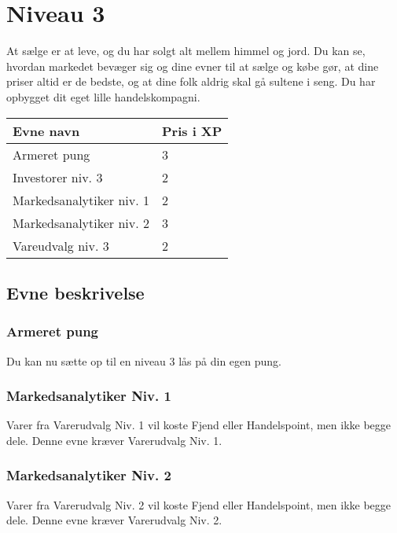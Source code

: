 \chapter{Niveau 3}

At sælge er at leve, og du har solgt alt mellem himmel og jord. Du kan se, hvordan markedet bevæger sig og dine evner til at sælge og købe gør, at dine priser altid er de bedste, og at dine folk aldrig skal gå sultene i seng. Du har opbygget dit eget lille handelskompagni. 

\begin{table}[H]
    \centering
    \begin{tabular}{|p{}|p{}|}
    \rowcolor{cerulean!80}\hline
        Evne navn & Pris i XP \\\hline
        Armeret pung & 3\\\hline
        Investorer niv. 3& 2\\\hline
        Markedsanalytiker niv. 1& 2\\\hline
        Markedsanalytiker niv. 2& 3\\\hline
        Vareudvalg niv. 3& 2\\\hline
    \end{tabular}
\end{table}
\section{Evne beskrivelse}

\subsection{Armeret pung}
Du kan nu sætte op til en niveau 3 lås på din egen pung.\\



\subsection{Markedsanalytiker Niv. 1}
Varer fra Varerudvalg Niv. 1 vil koste Fjend eller Handelspoint, men ikke begge dele. Denne evne kræver Varerudvalg Niv. 1.\\

\subsection{Markedsanalytiker Niv. 2}
Varer fra Varerudvalg Niv. 2 vil koste Fjend eller Handelspoint, men ikke begge dele. Denne evne kræver Varerudvalg Niv. 2.\\

